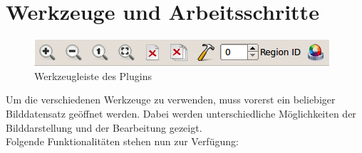 \newpage

\section{Werkzeuge und Arbeitsschritte}

\begin{figure}[h]
\centering
\includegraphics{gfx/Handbuch/toolbar.png}
\caption[Werkzeugleiste des Plugins]{Werkzeugleiste des Plugins}
\label{gr:toolbar}
\end{figure}
\FloatBarrier

Um die verschiedenen Werkzeuge zu verwenden, muss vorerst ein beliebiger Bilddatensatz ge\"offnet werden. Dabei werden unterschiedliche M\"oglichkeiten der Bilddarstellung und der Bearbeitung gezeigt.\\
Folgende Funktionalit\"aten stehen nun zur Verf\"ugung:\\
